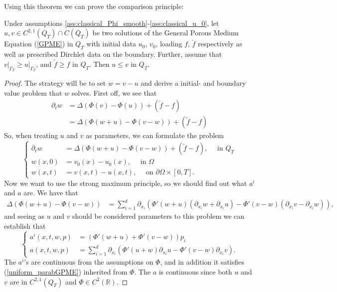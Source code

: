 \documentclass[11pt, a4paper]{article}
\begin{document}
Using this theorem we can prove the comparison principle:
\begin{lemma}
\label{lemma:comparison}
Under assumptions \ref{ass:classical_Phi_smooth}-\ref{ass:classical_u_0}, let $u,v \in C^{2,1}(Q_T)\cap C(\overline{Q}_T)$ be two solutions of the General Porous Medium Equation (\ref{GPME}) in $Q_T$ with initial data $u_0$, $v_0$, loading $f$, $\tilde{f}$ respectively as well as prescribed Dirchlet data on the boundary. Further, assume that $v\big|_{\Gamma_T} \geq u\big|_{\Gamma_T}$, and  $\tilde{f} \geq f$ in $Q_T$. Then $u \leq v$ in $Q_T$.
\end{lemma}
\begin{proof}
The strategy will be to set $w = v-u$ and derive a initial- and boundary value problem that  $w$ solves. First off, we see that
\begin{align*}
\partial_t w &= \Delta(\Phi(v) - \Phi(u)) + (\tilde{f}-f) \\
&= \Delta ( \Phi(w+u) - \Phi(v-w) ) + (\tilde{f}-f)
\end{align*}
So, when treating $u$ and $v$ as parameters, we can formulate the problem
\begin{equation}
\begin{cases}
\partial_t w &= \Delta ( \Phi(w+u) - \Phi(v-w) ) + (\tilde{f}-f), \quad \text{ in } Q_T \\
w(x,0) &= v_0(x) - u_0(x), \quad \text{ in } \Omega \\
w(x,t) &= v(x,t) - u(x,t), \quad \text{ on } \partial \Omega \times [0,T].
\end{cases}
\end{equation}
Now we want to use the strong maximum principle, so we should find out what $a^i$ and $a$ are. We have that
\begin{align*}
\Delta ( \Phi(w+u) - \Phi(v-w) )&= \sum_{i=1}^d \partial_{x_i}\left(\Phi'(w+u)(\partial_{x_i}w + \partial_{x_i}u) - \Phi'(v-w)(\partial_{x_i}v-\partial_{x_i}w) \right),
\end{align*} 
and seeing as $u$ and $v$ should be considered parameters to this problem we can establish that
\begin{equation*}
\begin{cases}
a^i(x,t,w,p) &= (\Phi'(w+u) + \Phi'(v-w))p_i \\
a(x,t,w,p) &= \sum_{i=1}^d \partial_{x_i}\left( \Phi'(u+w)\partial_{x_i}u - \Phi'(v-w)\partial_{x_i}v\right).
\end{cases}
\end{equation*}
The $a^i$'s are continuous from the assumptions on $\Phi$, and in addition it satisfies (\ref{uniform_parabGPME}) inherited from $\Phi$. The $a$ is continuous since both $u$ and $v$ are in $C^{2,1}(Q_T)$ and $\Phi \in C^2(\mathbb{R})$.


\end{proof}
\end{document}
